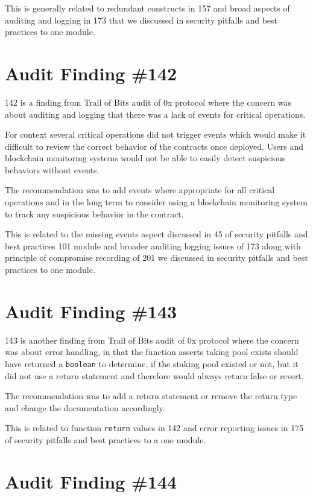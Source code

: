 This is generally related to redundant constructs in 157 and broad aspects of auditing and logging in 173 that we discussed in security pitfalls and best practices to one module.

\section{Audit Finding \#142}

142 is a finding from Trail of Bits audit of 0x protocol where the concern was about auditing and logging that there was a lack of events for critical operations. 

For context several critical operations did not trigger events which would make it difficult to review the correct behavior of the contracts once deployed. Users and blockchain monitoring systems would not be able to easily detect suspicious behaviors without events.

The recommendation was to add events where appropriate for all critical operations and in the long term to consider using a blockchain monitoring system to track any suspicious behavior in the contract.

This is related to the missing events aspect discussed in 45 of security pitfalls and best practices 101 module and broader auditing logging issues of 173 along with principle of compromise recording of 201 we discussed in security pitfalls and best practices to one module.

\section{Audit Finding \#143}

143 is another finding from Trail of Bits audit of 0x protocol where the concern was about error handling, in that the function asserts taking pool exists should have returned a \verb|boolean| to determine, if the staking pool existed or not, but it did not use a return statement and therefore would always return false or revert.

The recommendation was to add a return statement or remove the return type and change the documentation accordingly.

This is related to function \verb|return| values in 142 and error reporting issues in 175 of security pitfalls and best practices to a one module.

\section{Audit Finding \#144}

